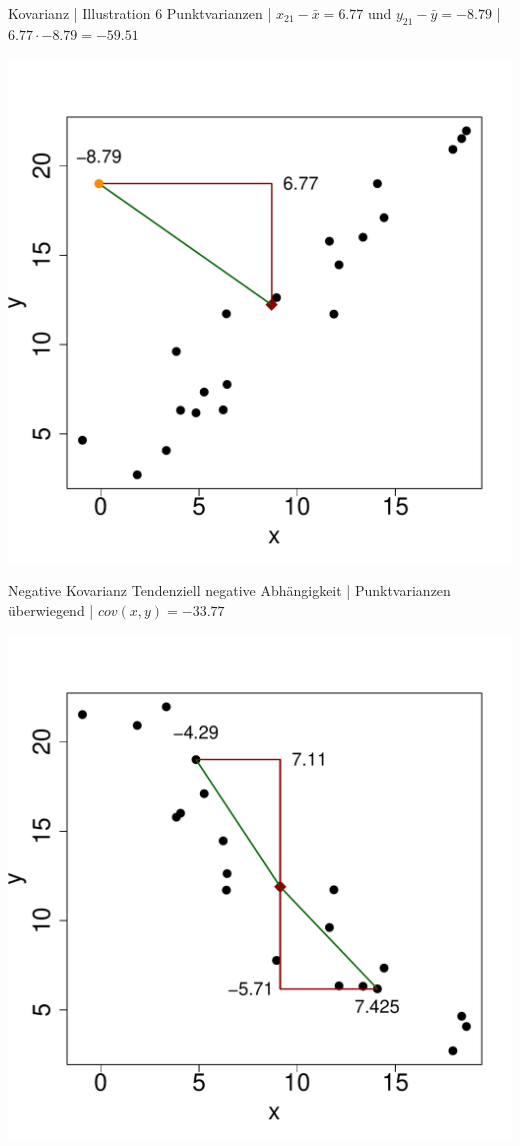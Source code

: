 \begin{frame}
  {Kovarianz | Illustration 6}
  Punktvarianzen | $x_{21}-\bar{x}=6.77$ und $y_{21}-\bar{y}=-8.79$ | \alert{$6.77\cdot-8.79=-59.51$}\\
  \begin{center}
    \includegraphics[height=0.7\textheight]{graphics/cov07}
  \end{center}
\end{frame}

\begin{frame}
  {Negative Kovarianz}
  Tendenziell negative Abhängigkeit | Punktvarianzen überwiegend | $cov(x,y)=-33.77$\\
  \begin{center}
    \includegraphics[height=0.7\textheight]{graphics/cov08}
  \end{center}
\end{frame}

